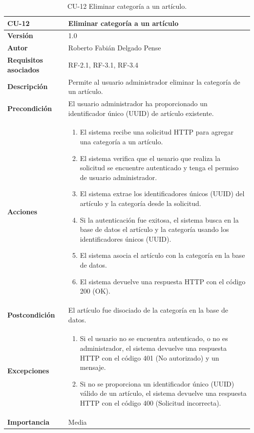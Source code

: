 \begin{table}[p]
	\centering
	\begin{tabularx}{\linewidth}{ p{} p{} }
		\toprule
		\textbf{CU-12}    & \textbf{Eliminar categoría a un artículo}\\
		\toprule
		\textbf{Versión}              & 1.0    \\
		\textbf{Autor}                & Roberto Fabián Delgado Pense \\
		\textbf{Requisitos asociados} & RF-2.1, RF-3.1, RF-3.4 \\ 
		\textbf{Descripción}          & Permite al usuario administrador eliminar la categoría de un artículo. \\
		\textbf{Precondición}         & El usuario administrador ha proporcionado un identificador único (UUID) de artículo existente. \\
		\textbf{Acciones}             &
		\begin{enumerate}
			\def\labelenumi{\arabic{enumi}.}
			\tightlist
			\item El sistema recibe una solicitud HTTP para agregar una categoría a un artículo.
                \item El sistema verifica que el usuario que realiza la solicitud se encuentre autenticado y tenga el permiso de usuario administrador.
			\item El sistema extrae los identificadores únicos (UUID) del artículo y la categoría desde la                  solicitud.
                \item Si la autenticación fue exitosa, el sistema busca en la base de datos el artículo y la categoría usando los identificadores únicos (UUID).
                \item El sistema asocia el artículo con la categoría en la base de datos.
                \item El sistema devuelve una respuesta HTTP con el código 200 (OK).
            \end{enumerate}\\
		\textbf{Postcondición}        & El artículo fue disociado de la categoría en la base de datos.\\
		\textbf{Excepciones}          & 
            \begin{enumerate}
			\def\labelenumi{\arabic{enumi}.}
			\tightlist
   			\item Si el usuario no se encuentra autenticado, o no es administrador, el sistema devuelve una                 respuesta HTTP con el código 401 (No autorizado) y un mensaje.
                \item Si no se proporciona un identificador único (UUID) válido de un artículo, el sistema devuelve una respuesta HTTP con el código 400 (Solicitud incorrecta).
            \end{enumerate}\\
		\textbf{Importancia}          & Media \\
		\bottomrule
	\end{tabularx}
	\caption{CU-12 Eliminar categoría a un artículo.}
\end{table}


